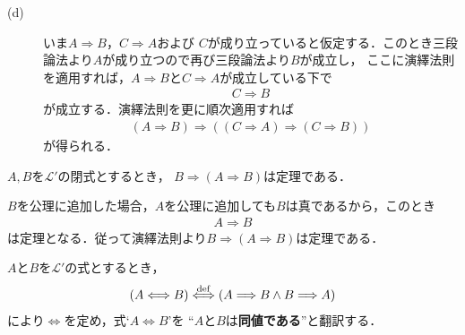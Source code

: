 \begin{prf}
\begin{description}
			\item[(d)]
				いま$A \Longrightarrow B$，$C \Longrightarrow A$および
				$C$が成り立っていると仮定する．このとき三段論法より$A$が成り立つので再び三段論法より$B$が成立し，
				ここに演繹法則を適用すれば，$A \Longrightarrow B$と$C \Longrightarrow A$が成立している下で
				\begin{align}
					C \Longrightarrow B
				\end{align}
				が成立する．演繹法則を更に順次適用すれば
				\begin{align}
					(A \Longrightarrow B) \Longrightarrow ( (C \Longrightarrow A) \Longrightarrow (C \Longrightarrow B) )
				\end{align}
				が得られる．
				\QED
		\end{description}
	\end{prf}
	
	\begin{screen}
		\begin{logicalthm}[正しい式は仮定を選ばない]\label{logicalthm:rule_of_inference_2}
			$A,B$を$\mathcal{L}'$の閉式とするとき，
			$B \Longrightarrow (A \Longrightarrow B)$は定理である．
		\end{logicalthm}
	\end{screen}
	
	\begin{prf}
		$B$を公理に追加した場合，$A$を公理に追加しても$B$は真であるから，このとき
		\begin{align}
			A \Longrightarrow B
		\end{align}
		は定理となる．従って演繹法則より$B \Longrightarrow (A \Longrightarrow B)$は定理である．
		\QED
	\end{prf}
	
	$A$と$B$を$\mathcal{L}'$の式とするとき，
	\begin{align}
		(A \Longleftrightarrow B) \overset{\mathrm{def}}{\Longleftrightarrow}
		(A \Longrightarrow B \wedge B \Longrightarrow A)
	\end{align}
	により$\Longleftrightarrow$を定め，式`$A \Longleftrightarrow B$'を
	``$A$と$B$は{\bf 同値である}''と翻訳する．
	
